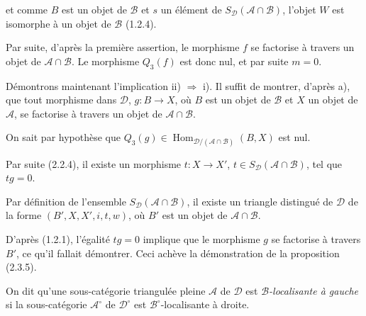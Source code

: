 \clearpage
{}%
\begingroup
\small
\setlength{\parskip}{0pt}%
\setlength{\emergencystretch}{1.5em}%

\noindent et comme $B$ est un objet de $\mathcal B$ et $s$ un élément de
$S_{\mathcal D}(\mathcal A\cap\mathcal B)$, l'objet $W$ est isomorphe à un
objet de $\mathcal B$ (1.2.4).

Par suite, d'après la première assertion, le morphisme $f$ se factorise à
travers un objet de $\mathcal A\cap\mathcal B$. Le morphisme $Q_3(f)$ est
donc nul, et par suite $m=0$.

Démontrons maintenant l'implication ii) $\Rightarrow$ i). Il suffit de
montrer, d'après a), que tout morphisme dans $\mathcal D$,
$g\colon B\longrightarrow X$, où $B$ est un objet de $\mathcal B$ et $X$
un objet de $\mathcal A$, se factorise à travers un objet de
$\mathcal A\cap\mathcal B$.

On sait par hypothèse que
$Q_3(g)\in
\operatorname{Hom}_{\mathcal D/(\mathcal A\cap\mathcal B)}(B,X)$ est nul.

Par suite (2.2.4), il existe un morphisme
$t\colon X\longrightarrow X'$, $t\in
S_{\mathcal D}(\mathcal A\cap\mathcal B)$, tel que $tg=0$.

Par définition de l'ensemble
$S_{\mathcal D}(\mathcal A\cap\mathcal B)$, il existe un triangle distingué
de $\mathcal D$ de la forme $(B',X,X',i,t,w)$, où $B'$ est un objet de
$\mathcal A\cap\mathcal B$.

D'après (1.2.1), l'égalité $tg=0$ implique que le morphisme $g$ se
factorise à travers $B'$, ce qu'il fallait démontrer. Ceci achève la
démonstration de la proposition (2.3.5).

\medskip
On dit qu'une sous-catégorie triangulée pleine $\mathcal A$ de $\mathcal D$
est \emph{$\mathcal B$-localisante à gauche} si la sous-catégorie
$\mathcal A^\circ$ de $\mathcal D^\circ$ est $\mathcal B^\circ$-localisante
à droite.
\endgroup
